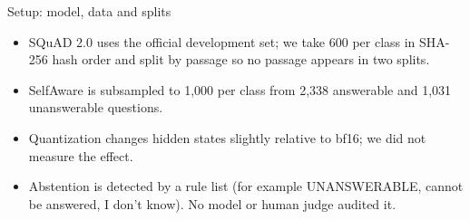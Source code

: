 \documentclass[aspectratio=169,11pt,usepdftitle=false]{beamer}
\begin{document}
\begin{frame}{Setup: model, data and splits}
{\begin{itemize}
\item SQuAD 2.0 uses the official development set; we take 600 per class in SHA-256 hash order and split by passage so no passage appears in two splits.
\item SelfAware is subsampled to 1,000 per class from 2,338 answerable and 1,031 unanswerable questions.
\item Quantization changes hidden states slightly relative to bf16; we did not measure the effect.
\item Abstention is detected by a rule list (for example UNANSWERABLE, cannot be answered, I don't know). No model or human judge audited it.
\end{itemize}}
\end{frame}

\end{document}
